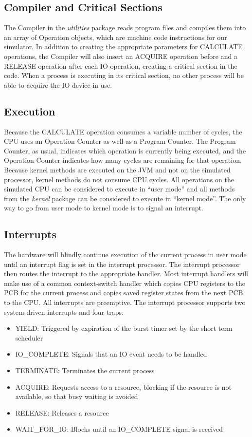 \documentclass[paper=a4, fontsize=11pt]{scrartcl} %
\numberwithin{equation}{section} %
\numberwithin{figure}{section} %
\numberwithin{table}{section} %
\begin{document}
\subsection{Compiler and Critical Sections}
The Compiler in the \textit{utilities} package reads program files and compiles them into an array of Operation objects, which are machine code instructions for our simulator. In addition to creating the appropriate parameters for CALCULATE operations, the Compiler will also insert an ACQUIRE operation before and a RELEASE operation after each IO operation, creating a critical section in the code. When a process is executing in its critical section, no other process will be able to acquire the IO device in use.

\subsection{Execution}
Because the CALCULATE operation consumes a variable number of cycles, the CPU uses an Operation Counter as well as a Program Counter. The Program Counter, as usual, indicates which operation is currently being executed, and the Operation Counter indicates how many cycles are remaining for that operation.
Because kernel methods are executed on the JVM and not on the simulated processor, kernel methods do not consume CPU cycles. All operations on the simulated CPU can be considered to execute in ``user mode'' and all methods from the \textit{kernel} package can be considered to execute in ``kernel mode''. The only way to go from user mode to kernel mode is to signal an interrupt.

\subsection{Interrupts}

The hardware will blindly continue execution of the current process in user mode until an interrupt flag is set in the interrupt processor. The interrupt processor then routes the interrupt to the appropriate handler. Most interrupt handlers will make use of a common context-switch handler which copies CPU registers to the PCB for the current process and copies saved register states from the next PCB to the CPU. All interrupts are preemptive. The interrupt processor supports two system-driven interrupts and four traps:


\begin{itemize}
	\item YIELD: Triggered by expiration of the burst timer set by the short term scheduler
          \item IO\_COMPLETE: Signals that an IO event needs to be handled
           \item TERMINATE: Terminates the current process
	\item ACQUIRE: Requests access to a resource, blocking if the resource is not available, so that busy waiting is avoided
	\item RELEASE: Releases a resource
	\item WAIT\_FOR\_IO: Blocks until an IO\_COMPLETE signal is received
\end{itemize}
\end{document}
